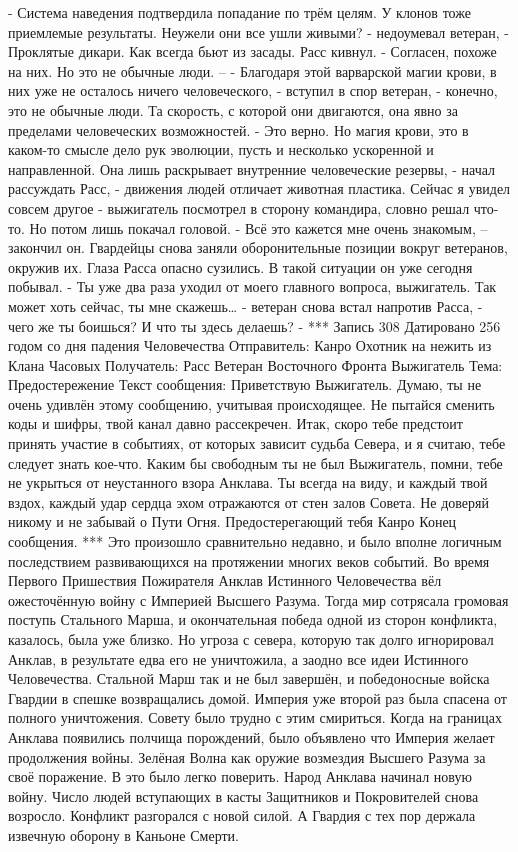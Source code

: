 \documentclass[a4paper, 12pt]{report}
\begin{document}
- Система наведения подтвердила попадание по трём целям. У клонов тоже приемлемые результаты. Неужели они все ушли живыми? - недоумевал ветеран, - Проклятые дикари. Как всегда бьют из засады.
Расс кивнул.
- Согласен, похоже на них. Но это не обычные люди. –
- Благодаря этой варварской магии крови, в них  уже не осталось ничего человеческого, - вступил в спор ветеран, - конечно, это не обычные люди. Та скорость, с которой они двигаются, она явно за пределами человеческих возможностей. 
- Это верно. Но магия крови, это в каком-то смысле дело рук эволюции, пусть и несколько ускоренной и направленной. Она лишь раскрывает внутренние человеческие резервы, - начал рассуждать Расс, - движения людей отличает животная пластика. Сейчас я увидел совсем другое -  выжигатель посмотрел в сторону командира, словно решал что-то. Но потом лишь покачал головой.
 - Всё это кажется мне очень знакомым, – закончил он.
Гвардейцы снова заняли оборонительные позиции вокруг ветеранов, окружив их. Глаза Расса опасно сузились. В такой ситуации он уже сегодня побывал.
- Ты уже два раза уходил от моего главного вопроса, выжигатель. Так может хоть сейчас, ты мне скажешь… - ветеран снова встал напротив Расса, - чего же ты боишься? И что ты здесь делаешь? -
***
Запись 308
Датировано 256 годом со дня падения Человечества
Отправитель: Канро Охотник на нежить из Клана Часовых
Получатель: Расс Ветеран Восточного Фронта Выжигатель
Тема: Предостережение
Текст сообщения:	
	Приветствую Выжигатель. Думаю, ты не очень удивлён этому сообщению, учитывая происходящее. Не пытайся сменить коды и шифры, твой канал давно рассекречен. Итак, скоро тебе предстоит принять участие в событиях, от которых зависит судьба Севера, и я считаю, тебе следует знать кое-что. Каким бы свободным ты не был Выжигатель, помни, тебе не укрыться от неустанного взора Анклава. Ты всегда на виду, и каждый твой вздох, каждый удар сердца эхом отражаются от стен залов Совета. Не доверяй никому и не забывай о Пути Огня.
Предостерегающий тебя 
Канро
Конец сообщения. 
***
	Это произошло сравнительно недавно, и было вполне логичным последствием развивающихся на протяжении многих веков событий. Во время Первого Пришествия Пожирателя Анклав Истинного Человечества вёл ожесточённую войну с Империей Высшего Разума. Тогда мир сотрясала громовая поступь Стального Марша, и окончательная победа одной из сторон конфликта, казалось, была уже близко. Но угроза с севера, которую так долго игнорировал Анклав, в результате едва его не уничтожила, а заодно все идеи Истинного Человечества. Стальной Марш так и не был завершён, и победоносные войска Гвардии в спешке возвращались домой. Империя уже второй раз была спасена от полного уничтожения. Совету было трудно с этим смириться. Когда на границах Анклава появились полчища порождений, было объявлено что Империя желает продолжения войны. Зелёная Волна как оружие возмездия Высшего Разума за своё поражение. В это было легко поверить. Народ Анклава начинал новую войну. Число людей вступающих в касты Защитников и Покровителей снова возросло. Конфликт разгорался с новой силой. А Гвардия с тех пор держала извечную оборону в Каньоне Смерти.
\end{document}
